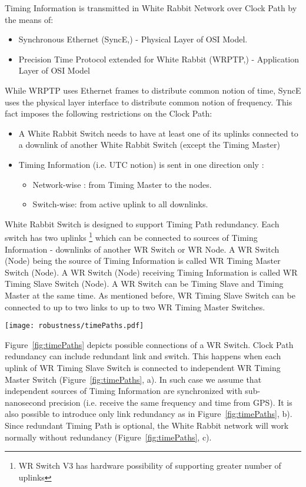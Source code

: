 Timing Information is transmitted in White Rabbit Network over Clock Path by
the means of:
\begin{itemize}
  \item Synchronous Ethernet (SyncE,\cite{SynchE}) - Physical Layer of OSI
Model.
  \item Precision Time Protocol \cite{IEEE1588} extended for White Rabbit
(WRPTP,\cite{WRPTP}) - Application Layer of OSI Model
\end{itemize}
While WRPTP uses Ethernet frames to distribute common notion of time, SyncE
uses the physical layer interface to distribute common notion of frequency. This
fact imposes the following restrictions on the Clock Path:
\begin{itemize}
  \item A White Rabbit Switch needs to have at least one of its uplinks
connected to a downlink of another White Rabbit Switch (except the Timing
Master)
  \item Timing Information (i.e. UTC notion) is sent in one direction only : 
    \begin{itemize}
      \item Network-wise : from Timing Master to the nodes.
      \item Switch-wise: from active uplink to all downlinks.
    \end{itemize}
\end{itemize}

White Rabbit Switch is designed to support Timing Path redundancy. Each switch
has two uplinks \footnote{WR Switch V3 has hardware possibility of supporting
greater number of uplinks} which can be connected to sources of Timing
Information - downlinks of another WR Switch or WR Node. A WR Switch (Node)
being the source of Timing Information is called WR Timing Master Switch (Node).
A WR Switch (Node) receiving Timing Information is called WR Timing Slave Switch
(Node). A WR Switch can be Timing Slave and Timing Master at the same time. As
mentioned before, WR Timing Slave Switch can be connected to up to two links
to up to two WR Timing Master Switches.

\begin{center}
	\texttt{[image: robustness/timePaths.pdf]}
	\label{fig:timePaths}
\end{center}

Figure~\ref{fig:timePaths} depicts possible connections of a WR Switch. Clock
Path redundancy can include redundant link and switch. This happens when each
uplink of WR Timing Slave Switch is connected to independent WR Timing Master
Switch (Figure~\ref{fig:timePaths}, a). In such case we assume that independent
sources of Timing Information are synchronized with sub-nanosecond precision 
(i.e. receive the same frequency and time from GPS). It is also possible to
introduce only link redundancy as in Figure~\ref{fig:timePaths}, b). Since
redundant Timing Path is optional, the
White Rabbit network will work normally without redundancy
(Figure~\ref{fig:timePaths}, c).


